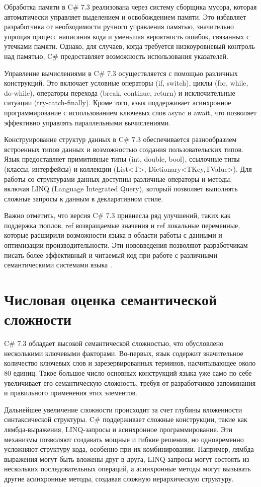 \documentclass[a4paper, 12pt]{article}
\begin{document}
Обработка памяти в C\# 7.3 реализована через систему сборщика мусора, которая автоматически управляет выделением и освобождением памяти. Это избавляет разработчика от необходимости ручного управления памятью, значительно упрощая процесс написания кода и уменьшая вероятность ошибок, связанных с утечками памяти. Однако, для случаев, когда требуется низкоуровневый контроль над памятью, C\# предоставляет возможность использования указателей.

Управление вычислениями в C\# 7.3 осуществляется с помощью различных конструкций. Это включает условные операторы (if, switch), циклы (for, while, do-while), операторы перехода (break, continue, return) и исключительные ситуации (try-catch-finally). Кроме того, язык поддерживает асинхронное программирование с использованием ключевых слов async и await, что позволяет эффективно управлять параллельными вычислениями.

Конструирование структур данных в C\# 7.3 обеспечивается разнообразием встроенных типов данных и возможностью создания пользовательских типов. Язык предоставляет примитивные типы (int, double, bool), ссылочные типы (классы, интерфейсы) и коллекции (List<T>, Dictionary<TKey,TValue>). Для работы со структурами данных доступны различные операторы и методы, включая LINQ (Language Integrated Query), который позволяет выполнять сложные запросы к данным в декларативном стиле.

Важно отметить, что версия C\# 7.3 привнесла ряд улучшений, таких как поддержка тюплов, ref возвращаемые значения и ref локальные переменные, которые расширили возможности языка в области работы с данными и оптимизации производительности. Эти нововведения позволяют разработчикам писать более эффективный и читаемый код при работе с различными семантическими системами языка \cite{csharp_concepts}.

\section{Числовая оценка семантической сложности}
C\# 7.3 обладает высокой семантической сложностью, что обусловлено несколькими ключевыми факторами. Во-первых, язык содержит значительное количество ключевых слов и зарезервированных терминов, насчитывающее около 80 единиц. Такое большое число основных конструкций языка уже само по себе увеличивает его семантическую сложность, требуя от разработчиков запоминания и правильного применения этих элементов.

Дальнейшее увеличение сложности происходит за счет глубины вложенности синтаксической структуры. C\# поддерживает сложные конструкции, такие как лямбда-выражения, LINQ-запросы и асинхронное программирование. Эти механизмы позволяют создавать мощные и гибкие решения, но одновременно усложняют структуру кода, особенно при их комбинировании. Например, лямбда-выражения могут быть вложены друг в друга, LINQ-запросы могут состоять из нескольких последовательных операций, а асинхронные методы могут вызывать другие асинхронные методы, создавая сложную иерархическую структуру.
\end{document}

